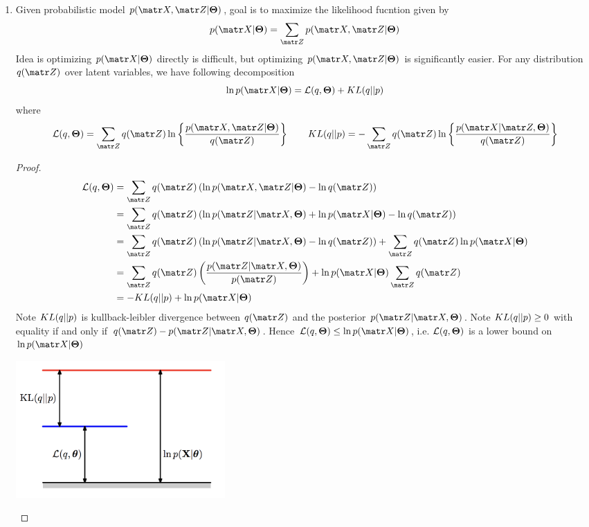 \documentclass[11pt]{article}
\begin{document}
\begin{enumerate}
    \item Given probabilistic model $p(\bX, \bZ | \bTheta)$, goal is to maximize the likelihood fucntion given by 
    \[
        p(\bX | \bTheta) = \sum_{\bZ} p(\bX, \bZ | \bTheta)    
    \]
    Idea is optimizing $p(\bX | \bTheta)$ directly is difficult, but optimizing $p(\bX, \bZ | \bTheta)$ is significantly easier. For any distribution $q(\bZ)$ over latent variables, we have following decomposition 
    \[
        \ln p(\bX | \bTheta) = \calL(q, \bTheta) + \kl{q}{p}
    \]
    where 
    \[
        \calL(q,\bTheta) = \sum_{\bZ} q(\bZ) \ln \left\{ \frac{p(\bX, \bZ | \bTheta)}{q(\bZ)} \right\}
        \qquad 
        \kl{q}{p} = - \sum_{\bZ} q(\bZ) \ln \left\{ \frac{p(\bX | \bZ, \bTheta)}{q(\bZ)} \right\}
    \]
    \begin{proof}
        \begin{align*}
            \calL(q, \bTheta)
            &= \sum_{\bZ} q(\bZ) \left(  \ln p(\bX, \bZ | \bTheta) - \ln q(\bZ) \right) \\ 
            &= \sum_{\bZ} q(\bZ) \left(  \ln p(\bZ | \bX, \bTheta) + \ln p(\bX | \bTheta) - \ln q(\bZ) \right) \\
            &= \sum_{\bZ} q(\bZ) \left(  \ln p(\bZ | \bX, \bTheta) - \ln q(\bZ) \right) + \sum_{\bZ} q(\bZ) \ln p(\bX | \bTheta) \\
            &= \sum_{\bZ} q(\bZ) \left( \frac{p(\bZ |\bX, \bTheta)}{p(\bZ)} \right) + \ln p(\bX | \bTheta) \sum_{\bZ} q(\bZ) \\
            &= -\kl{q}{p} + \ln p(\bX | \bTheta)
        \end{align*}
        Note $KL(q || p)$ is kullback-leibler divergence between $q(\bZ)$ and the posterior $p(\bZ | \bX, \bTheta)$. Note $KL(q || p) \geq 0$ with equality if and only if $q(\bZ) - p(\bZ | \bX, \bTheta)$.  Hence $\calL(q, \bTheta) \leq \ln p(\bX | \bTheta)$, i.e. $\mathcal{L}(q,\boldsymbol{\Theta})$ is a lower bound on $\ln p(\bX | \bTheta)$
        \begin{center}
            \includegraphics[width=8cm]{kl_decomposition.png}
        \end{center}
    \end{proof}
\end{enumerate}
 
 
\end{document}
